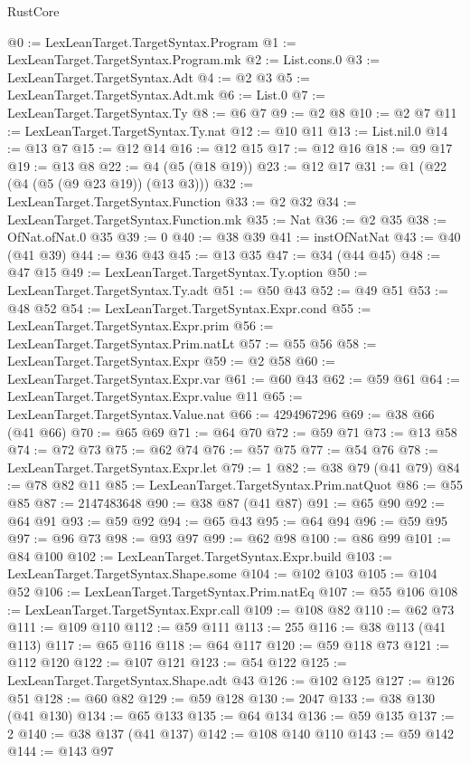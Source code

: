 \begin{lexlean}{RustCore}
\begin{coremodule}
@0 := LexLeanTarget.TargetSyntax.Program
@1 := LexLeanTarget.TargetSyntax.Program.mk
@2 := List.cons.{0}
@3 := LexLeanTarget.TargetSyntax.Adt
@4 := @2 @3
@5 := LexLeanTarget.TargetSyntax.Adt.mk
@6 := List.{0}
@7 := LexLeanTarget.TargetSyntax.Ty
@8 := @6 @7
@9 := @2 @8
@10 := @2 @7
@11 := LexLeanTarget.TargetSyntax.Ty.nat
@12 := @10 @11
@13 := List.nil.{0}
@14 := @13 @7
@15 := @12 @14
@16 := @12 @15
@17 := @12 @16
@18 := @9 @17
@19 := @13 @8
@22 := @4 (@5 (@18 @19))
@23 := @12 @17
@31 := @1 (@22 (@4 (@5 (@9 @23 @19)) (@13 @3)))
@32 := LexLeanTarget.TargetSyntax.Function
@33 := @2 @32
@34 := LexLeanTarget.TargetSyntax.Function.mk
@35 := Nat
@36 := @2 @35
@38 := OfNat.ofNat.{0} @35
@39 := 0
@40 := @38 @39
@41 := instOfNatNat
@43 := @40 (@41 @39)
@44 := @36 @43
@45 := @13 @35
@47 := @34 (@44 @45)
@48 := @47 @15
@49 := LexLeanTarget.TargetSyntax.Ty.option
@50 := LexLeanTarget.TargetSyntax.Ty.adt
@51 := @50 @43
@52 := @49 @51
@53 := @48 @52
@54 := LexLeanTarget.TargetSyntax.Expr.cond
@55 := LexLeanTarget.TargetSyntax.Expr.prim
@56 := LexLeanTarget.TargetSyntax.Prim.natLt
@57 := @55 @56
@58 := LexLeanTarget.TargetSyntax.Expr
@59 := @2 @58
@60 := LexLeanTarget.TargetSyntax.Expr.var
@61 := @60 @43
@62 := @59 @61
@64 := LexLeanTarget.TargetSyntax.Expr.value @11
@65 := LexLeanTarget.TargetSyntax.Value.nat
@66 := 4294967296
@69 := @38 @66 (@41 @66)
@70 := @65 @69
@71 := @64 @70
@72 := @59 @71
@73 := @13 @58
@74 := @72 @73
@75 := @62 @74
@76 := @57 @75
@77 := @54 @76
@78 := LexLeanTarget.TargetSyntax.Expr.let
@79 := 1
@82 := @38 @79 (@41 @79)
@84 := @78 @82 @11
@85 := LexLeanTarget.TargetSyntax.Prim.natQuot
@86 := @55 @85
@87 := 2147483648
@90 := @38 @87 (@41 @87)
@91 := @65 @90
@92 := @64 @91
@93 := @59 @92
@94 := @65 @43
@95 := @64 @94
@96 := @59 @95
@97 := @96 @73
@98 := @93 @97
@99 := @62 @98
@100 := @86 @99
@101 := @84 @100
@102 := LexLeanTarget.TargetSyntax.Expr.build
@103 := LexLeanTarget.TargetSyntax.Shape.some
@104 := @102 @103
@105 := @104 @52
@106 := LexLeanTarget.TargetSyntax.Prim.natEq
@107 := @55 @106
@108 := LexLeanTarget.TargetSyntax.Expr.call
@109 := @108 @82
@110 := @62 @73
@111 := @109 @110
@112 := @59 @111
@113 := 255
@116 := @38 @113 (@41 @113)
@117 := @65 @116
@118 := @64 @117
@120 := @59 @118 @73
@121 := @112 @120
@122 := @107 @121
@123 := @54 @122
@125 := LexLeanTarget.TargetSyntax.Shape.adt @43
@126 := @102 @125
@127 := @126 @51
@128 := @60 @82
@129 := @59 @128
@130 := 2047
@133 := @38 @130 (@41 @130)
@134 := @65 @133
@135 := @64 @134
@136 := @59 @135
@137 := 2
@140 := @38 @137 (@41 @137)
@142 := @108 @140 @110
@143 := @59 @142
@144 := @143 @97

\end{coremodule}
\end{lexlean}
